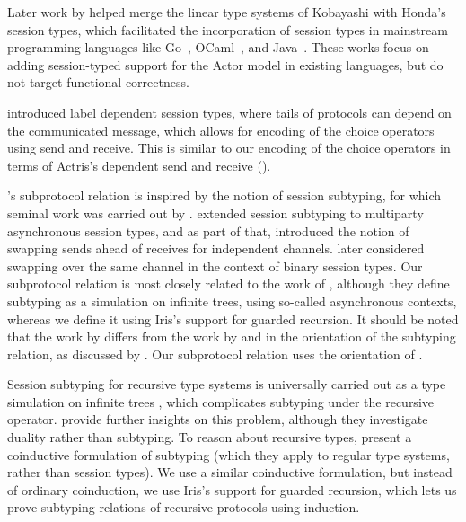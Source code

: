 Later work by \citet{dardha-PPDP2012} helped merge the linear type
systems of Kobayashi with Honda's session types, which facilitated the
incorporation of session types in mainstream programming
languages like Go~\cite{lange-ICSE2018},
OCaml~\cite{padovani-JFP2017, imai-soCP2019}, and
Java~\cite{hu-ECOOP2010}.
These works focus on adding session-typed support for the
Actor model in existing languages, but do not
target functional correctness.

\citet{DBLP:journals/pacmpl/ThiemannV20} introduced label dependent
session types, where tails of protocols can depend on the communicated message,
which allows for encoding of the choice operators using send and receive.
This is similar to our encoding of the choice operators in terms of Actris's
dependent send and receive ().

\lname's subprotocol relation is inspired by the notion of session subtyping,
for which seminal work was carried out by \citet{DBLP:journals/acta/GayH05}.
\citet{mostrous-ESOP2009} extended session subtyping to
multiparty asynchronous session types, and as part of that, introduced the notion of
swapping sends ahead of receives for independent channels.
\citet{mostrous-InfComput2015} later considered swapping over the same channel in
the context of binary session types.
Our subprotocol relation is most closely related to the work of
\citet{mostrous-InfComput2015},
although they define subtyping as a simulation on infinite trees,
using so-called asynchronous contexts, whereas we define it using Iris's
support for guarded recursion.
It should be noted that the work by \citet{DBLP:journals/acta/GayH05} differs
from the work by \citet{mostrous-ESOP2009} and
\citet{mostrous-InfComput2015} in the orientation of the subtyping relation,
as discussed by \citet{DBLP:conf/birthday/Gay16}.
Our subprotocol relation uses the orientation of
\citet{DBLP:journals/acta/GayH05}.

Session subtyping for recursive type systems is universally carried out as a type
simulation on infinite trees
\cite{DBLP:journals/acta/GayH05, mostrous-ESOP2009,mostrous-InfComput2015},
which complicates subtyping under the recursive operator.
\citet{DBLP:journals/corr/abs-2004-01322} provide further insights on this
problem, although they investigate duality rather than subtyping.
To reason about recursive types, \citet{DBLP:journals/fuin/BrandtH98} present
a coinductive formulation of subtyping (which they apply to regular type systems, rather
than session types).
We use a similar coinductive formulation, but instead of ordinary coinduction,
we use Iris's support for guarded recursion, which lets us
prove subtyping relations of recursive protocols using  induction.

